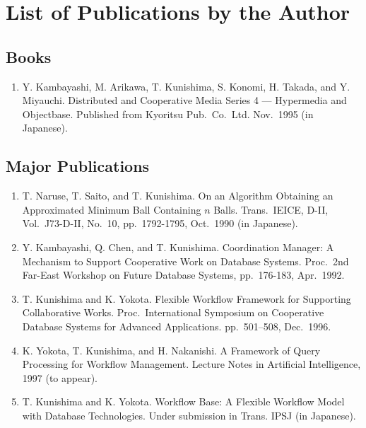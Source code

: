 
\chapter*{List of Publications by the Author}

\section*{Books}
\begin{enumerate}
 \item Y. Kambayashi, M. Arikawa, T. Kunishima, S. Konomi, H. Takada,
       and Y. Miyauchi.
       Distributed and Cooperative Media Series 4 --- Hypermedia and 
       Objectbase.
       Published from Kyoritsu Pub.\ Co.\ Ltd.
       Nov.\ 1995 (in Japanese).
\end{enumerate}

\section*{Major Publications}
\begin{enumerate}
 \item T. Naruse, T. Saito, and T. Kunishima.
       On an Algorithm Obtaining an Approximated Minimum Ball Containing
       $n$ Balls.
       Trans.\ IEICE, D-II, Vol.\ J73-D-II, No.\ 10, pp.\ 1792-1795,
       Oct.\ 1990
       (in Japanese).
 \item Y. Kambayashi, Q. Chen, and T. Kunishima.
       Coordination Manager: A Mechanism to Support Cooperative Work on
       Database Systems.
       Proc.\ 2nd Far-East Workshop on Future Database Systems,
       pp.\ 176-183,
       Apr.\ 1992.
 \item T. Kunishima and K. Yokota.
       Flexible Workflow Framework for Supporting Collaborative Works.
       Proc.\ International Symposium on Cooperative Database Systems for 
       Advanced Applications.
       pp.\ 501--508,
       Dec.\ 1996.
 \item K. Yokota, T. Kunishima, and H. Nakanishi.
       A Framework of Query Processing for Workflow Management.
       Lecture Notes in Artificial Intelligence,
       1997 (to appear).
 \item T. Kunishima and K. Yokota.  Workflow Base: A Flexible Workflow
       Model with Database Technologies.  Under submission in
       Trans. IPSJ (in Japanese).
\end{enumerate}


